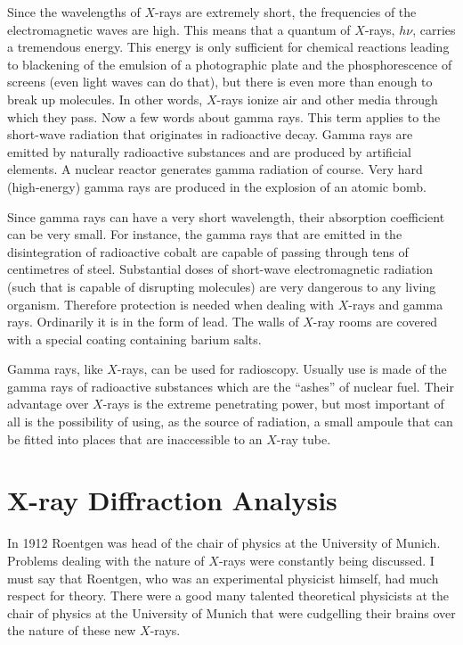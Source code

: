 Since the wavelengths of $X$-rays are extremely short, the frequencies of the electromagnetic waves are high. This means that a quantum of $X$-rays, $h\nu$, carries a tremendous energy. This energy is only sufficient for chemical reactions leading to blackening of the emulsion of a photographic plate and the phosphorescence of screens (even light waves can do that), but there is even more than enough to break up molecules. In other words, $X$-rays ionize air and other media through which they pass.
Now a few words about gamma rays. This term applies to the short-wave radiation that originates in radioactive decay. Gamma rays are emitted by naturally radioactive substances and are produced by artificial elements. A nuclear reactor generates gamma radiation of course. Very hard (high-energy) gamma rays are produced in the ex­plosion of an atomic bomb.

Since gamma rays can have a very short wavelength, their absorption coefficient can be very small. For instance, the gamma rays that are emitted in the disintegration of radioactive cobalt are capable of passing through tens of centimetres of steel.
Substantial doses of short-wave electromagnetic radia­tion (such that is capable of disrupting molecules) are very dangerous to any living organism. Therefore protec­tion is needed when dealing with $X$-rays and gamma rays. Ordinarily it is in the form of lead. The walls of $X$-ray rooms are covered with a special coating containing barium salts.

Gamma rays, like $X$-rays, can be used for radioscopy. Usually use is made of the gamma rays of radioactive substances which are the ``ashes'' of nuclear fuel. Their advantage over $X$-rays is the extreme penetrating power, but most important of all is the possibility of using, as the source of radiation, a small ampoule that can be fitted into places that are inaccessible to an $X$-ray tube.

\section{X-ray Diffraction Analysis}

In 1912 Roentgen was head of the chair of physics at the University of Munich. Problems dealing with the nature of $X$-rays were constantly being discussed. I must say that Roentgen, who was an experimental physicist himself, had much respect for theory. There were a good many talented theoretical physicists at the chair of physics at the University of Munich that were cudgelling their brains over the nature of these new $X$-rays.

